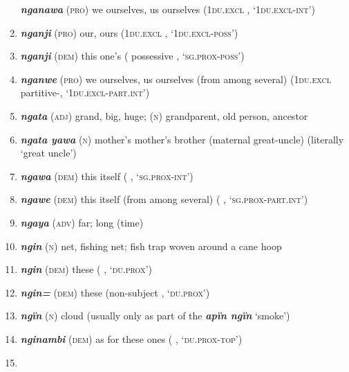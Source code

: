 \begin{enumerate}[noitemsep, label={}, align=left, widest=190, labelsep=1ex,leftmargin=*,itemindent=-10pt]
\textbf{\textit{nganawa}} (\textsc{pro}) we ourselves, us ourselves (\textsc{1du.excl} , \linebreak‘\textsc{1du.excl-int}’) \item 
\textbf{\textit{nganji}} (\textsc{pro}) our, ours (\textsc{1du.excl} , ‘\textsc{1du.excl-poss}’) \item 
\textbf{\textit{nganji}} (\textsc{dem}) this one’s (  possessive , \linebreak‘\textsc{sg.prox-poss}’) \item 
\textbf{\textit{nganwe}} (\textsc{pro}) we ourselves, us ourselves (from among several) (\textsc{1du.excl} \linebreak partitive-, ‘\textsc{1du.excl-part.int}’) \item 
\textbf{\textit{ngata}} (\textsc{adj}) grand, big, huge; (\textsc{n}) grandparent, old person, ancestor \item 
\textbf{\textit{ngata yawa}} (\textsc{n}) mother’s mother’s brother (maternal great-uncle) (literally \linebreak ‘great uncle’) \item 
\textbf{\textit{ngawa}} (\textsc{dem}) this itself (   , \linebreak‘\textsc{sg.prox-int}’) \item 
\textbf{\textit{ngawe}} (\textsc{dem}) this itself (from among several) (  \linebreak {} , ‘\textsc{sg.prox-part.int}’) \item 
\textbf{\textit{ngaya}} (\textsc{adv)} far; long (time) \item 
\textbf{\textit{ngin}} (\textsc{n}) net, fishing net; fish trap woven around a cane hoop \item 
\textbf{\textit{ngin}} (\textsc{dem}) these (  , ‘\textsc{du.prox}’) \item 
\textbf{\textit{ngin=}} (\textsc{dem}) these (non-subject   , ‘\textsc{du.prox}’) \item 
\textbf{\textit{ngïn}} (\textsc{n}) cloud (usually only as part of the  \textbf{\textit{apïn ngïn}} ‘smoke’) \item 
\textbf{\textit{nginambi}} (\textsc{dem}) as for these ones (   , ‘\textsc{du.prox-top}’) \item 

\end{enumerate}
